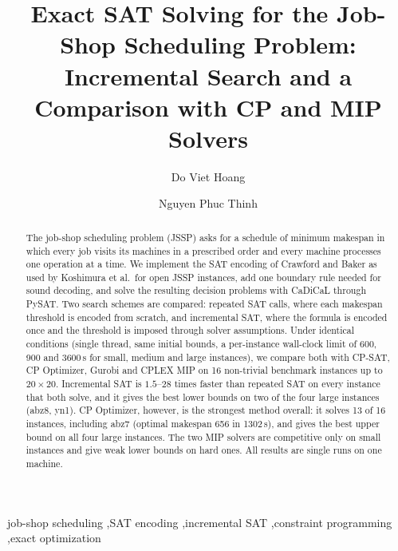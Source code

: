 \documentclass[a4paper,fleqn]{cas-sc}
\begin{document}
\title[mode=title]{Exact SAT Solving for the Job-Shop Scheduling Problem: Incremental Search and a Comparison with CP and MIP Solvers}

\author[1]{Do Viet Hoang}
\cormark[1]
\author[1]{Nguyen Phuc Thinh}
\address[1]{Faculty of Information Technology, VNU University of Engineering and Technology, Hanoi, Vietnam}

\begin{abstract}
The job-shop scheduling problem (JSSP) asks for a schedule of minimum makespan in which every job visits its machines in a prescribed order and every machine processes one operation at a time.
We implement the SAT encoding of Crawford and Baker as used by Koshimura et al.\ for open JSSP instances, add one boundary rule needed for sound decoding, and solve the resulting decision problems with CaDiCaL through PySAT.
Two search schemes are compared: repeated SAT calls, where each makespan threshold is encoded from scratch, and incremental SAT, where the formula is encoded once and the threshold is imposed through solver assumptions.
Under identical conditions (single thread, same initial bounds, a per-instance wall-clock limit of 600, 900 and 3600\,s for small, medium and large instances), we compare both with CP-SAT, CP Optimizer, Gurobi and CPLEX MIP on 16 non-trivial benchmark instances up to $20\times20$.
Incremental SAT is $1.5$--$28$ times faster than repeated SAT on every instance that both solve, and it gives the best lower bounds on two of the four large instances (abz8, yn1).
CP Optimizer, however, is the strongest method overall: it solves 13 of 16 instances, including abz7 (optimal makespan 656 in 1302\,s), and gives the best upper bound on all four large instances.
The two MIP solvers are competitive only on small instances and give weak lower bounds on hard ones.
All results are single runs on one machine.
\end{abstract}

\begin{keywords}
job-shop scheduling \sep SAT encoding \sep incremental SAT \sep constraint programming \sep exact optimization
\end{keywords}

\maketitle
\end{document}
